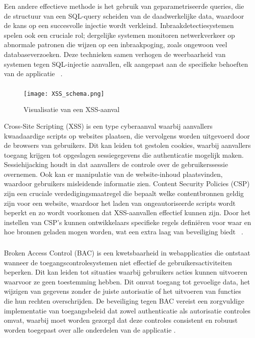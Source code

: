 Een andere effectieve methode 
is het gebruik van geparametriseerde queries, die de structuur van een SQL-query scheiden van de daadwerkelijke data, waardoor de kans op een succesvolle 
injectie wordt verkleind. Inbraakdetectiesystemen spelen ook een cruciale rol; dergelijke systemen monitoren netwerkverkeer op abnormale patronen die wijzen op 
een inbraakpoging, zoals ongewoon veel databaseverzoeken. Deze technieken samen verhogen de weerbaarheid van systemen tegen SQL-injectie aanvallen, elk 
aangepast aan de specifieke behoeften van de applicatie ~\autocite{Abdullayev2023}.

\subsubsection{}
\label{sec:Cross-Site Scripting (XSS)}
\begin{figure}
    \centering
    \texttt{[image: XSS\_schema.png]}
    \caption[Visualisatie van een XSS-aanval]{Visualisatie van een XSS-aanval}
\end{figure}

Cross-Site Scripting (XSS) is een type cyberaanval waarbij aanvallers kwaadaardige scripts op websites plaatsen, die vervolgens worden uitgevoerd door de 
browsers van gebruikers. Dit kan leiden tot gestolen cookies, waarbij aanvallers toegang krijgen tot opgeslagen sessiegegevens die authenticatie mogelijk 
maken. Sessiehijacking houdt in dat aanvallers de controle over de gebruikerssessie overnemen. Ook kan er manipulatie van de website-inhoud plaatsvinden, 
waardoor gebruikers misleidende informatie zien. Content Security Policies (CSP) zijn een cruciale verdedigingsmaatregel die bepaalt welke contentbronnen 
geldig zijn voor een website, waardoor het laden van ongeautoriseerde scripts wordt beperkt en zo wordt voorkomen dat XSS-aanvallen effectief kunnen zijn. 
Door het instellen van CSP's kunnen ontwikkelaars specifieke regels definiëren voor waar en hoe bronnen geladen mogen worden, wat een extra laag van beveiliging
biedt ~\autocite{Weamie2022}.

\subsubsection{}
\label{sec:Broken Access Control (BAC)}

Broken Access Control (BAC) is een kwetsbaarheid in webapplicaties die ontstaat wanneer de toegangscontrolesystemen niet effectief de gebruikersactiviteiten beperken. 
Dit kan leiden tot situaties waarbij gebruikers acties kunnen uitvoeren waarvoor ze geen toestemming hebben. Dit omvat toegang tot gevoelige data, het wijzigen 
van gegevens zonder de juiste autorisatie of het uitvoeren van functies die hun rechten overschrijden. De beveiliging tegen BAC vereist een zorgvuldige implementatie 
van toegangsbeleid dat zowel authenticatie als autorisatie controles omvat, waarbij moet worden gezorgd dat deze controles consistent en robuust worden toegepast over 
alle onderdelen van de applicatie \autocite{Anas2024}.


